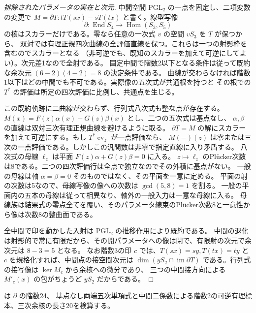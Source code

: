 \begin{proof}[排除されたパラメータの実在と次元]
中間空間 $\mathrm{PGL}_2$ の一点を固定し、二項変数の変更で
$M=\partial T:t T(sx)-s T(tx)$ と書く。線型写像
\[
        \partial:\operatorname{End}S_4\to\operatorname{Hom}(S_3,S_5)
\]
の核はスカラーだけである。零なら任意の一次式 $v$ の空間 $vS_3$ を $T$ が保つから、
双対では有理正規四次曲線の全評価直線を保つ。これらは一つの射影枠を含むのでスカラーとなる
（非可逆でも、既知のスカラーを加えて可逆にしてよい）。次元差1なので全射である。
固定中間で階数2以下となる条件は従って既約な余次元 $(6-2)(4-2)=8$ の決定条件である。
曲線が交わらなければ階数1以下はどの中間でも不可である。実際像の五次式が共通根を持つと
その根での $T^*$ の評価は所定の四次評価に比例し、共通点を生じる。

この既約軌跡に二曲線が交わらず、行列式八次式も整な点が存在する。
$M(x)=F(z)\alpha(x)+G(z)\beta(x)$ とし、二つの五次式は基点なし、
$\alpha,\beta$ の直線は双対三次有理正規曲線を避けるように取る。
$\partial T=M$ の解にスカラーを加えて可逆にする。もし $T^*\operatorname{ev}_z$ が一点評価なら、
$M(-)(z)$ は零または三次の一点評価である。しかしこの汎関数は非零で指定直線に入り矛盾する。
八次式の母線 $\ell_z$ は平面 $F(z)\alpha+G(z)\beta=0$ に入る。
$z\mapsto\ell_z$ のPlücker次数は8である。二つの四次評価行は全点で独立なのでその外積に基点がない。
一般の母線は軸 $\alpha=\beta=0$ そのものではなく、その平面を一意に定める。
平面の射の次数は5なので、母線写像の像への次数は $\gcd(5,8)=1$ を割る。
一般の平面内の五本の母線は従って相異なり、軸外の一般入力は一意な母線に入る。
母線族は結果式の零点全てを覆い、そのパラメータ線束のPlücker次数8と一意性から像は次数8の整曲面である。

全中間で印を動かした入射は $\mathrm{PGL}_2$ の推移作用により既約である。
中間の退化は射影的で常に有限だから、その開パラメータへの像は閉で、有限射の次元で余次元は $8-3=5$ となる。
なお階数3の印 $c$ では、$T(sx)=s y,T(tx)=t y$ と $c$ を規格化すれば、中間点の接空間次元は
$\dim(y S_2\cap\operatorname{im}\partial T)$ である。行列式の接写像は $\ker M_c$ から余核への微分であり、
三つの中間接方向による $M'_c(x)$ の包がちょうど $y S_2$ だからである。
\end{proof}

 は $\partial$ の階数24、
基点なし両端五次単項式と中間二係数による階数2の可逆有理標本、三次余核の長さ20を検算する。
